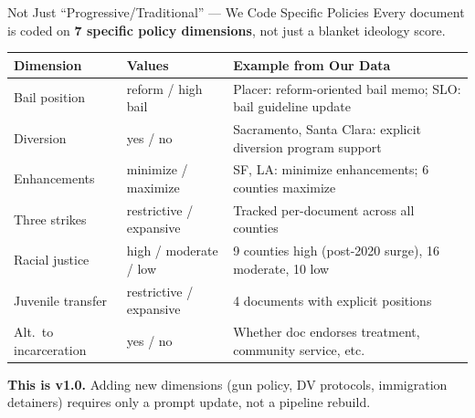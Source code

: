 \documentclass[aspectratio=169, 11pt]{beamer}
\begin{document}
\begin{frame}{Not Just ``Progressive/Traditional'' --- We Code Specific Policies}
{\small Every document is coded on \textbf{7 specific policy dimensions}, not just a blanket ideology score.}
\vspace{3pt}
{\footnotesize
\begin{tabularx}{\textwidth}{l l X}
\toprule
\textbf{Dimension} & \textbf{Values} & \textbf{Example from Our Data} \\
\midrule
Bail position & reform / high bail & Placer: reform-oriented bail memo; SLO: bail guideline update \\
Diversion & yes / no & Sacramento, Santa Clara: explicit diversion program support \\
Enhancements & minimize / maximize & SF, LA: minimize enhancements; 6 counties maximize \\
Three strikes & restrictive / expansive & Tracked per-document across all counties \\
Racial justice & high / moderate / low & 9 counties high (post-2020 surge), 16 moderate, 10 low \\
Juvenile transfer & restrictive / expansive & 4 documents with explicit positions \\
Alt.\ to incarceration & yes / no & Whether doc endorses treatment, community service, etc. \\
\bottomrule
\end{tabularx}}
\vspace{4pt}
\begin{alertblock}{}
\textbf{This is v1.0.} Adding new dimensions (gun policy, DV protocols, immigration detainers) requires only a prompt update, not a pipeline rebuild.
\end{alertblock}
\end{frame}
\end{document}
